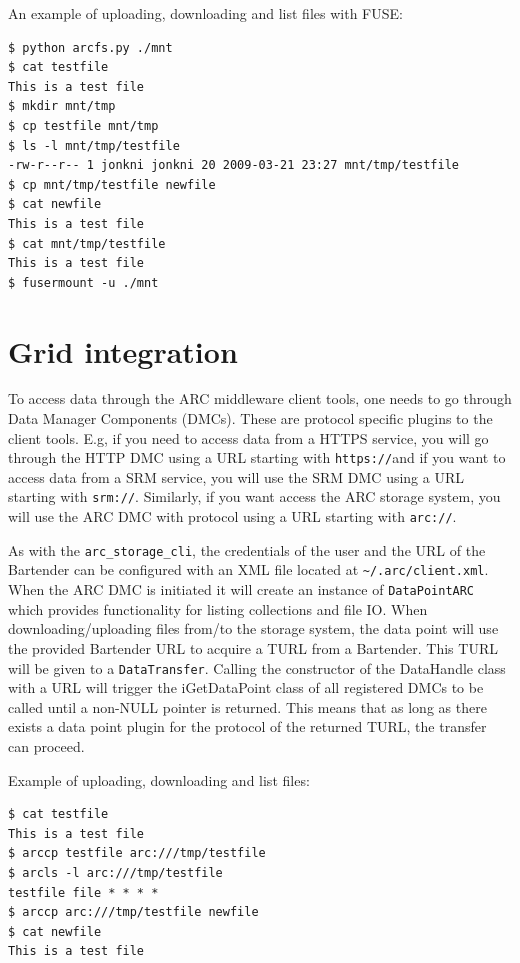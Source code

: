 \documentclass{book}
\begin{document}
An example of uploading, downloading and list files with FUSE:

\begin{verbatim}
$ python arcfs.py ./mnt
$ cat testfile
This is a test file
$ mkdir mnt/tmp
$ cp testfile mnt/tmp
$ ls -l mnt/tmp/testfile
-rw-r--r-- 1 jonkni jonkni 20 2009-03-21 23:27 mnt/tmp/testfile
$ cp mnt/tmp/testfile newfile
$ cat newfile
This is a test file
$ cat mnt/tmp/testfile
This is a test file
$ fusermount -u ./mnt
\end{verbatim}



\section{Grid integration} %
\label{sec:grid_integration}

To access data through the ARC middleware client tools, one needs to go through Data Manager Components (DMCs). These are protocol specific plugins to the client tools. E.g, if you need to access data from a HTTPS service, you will go through the HTTP DMC using a URL starting with \verb!https://!and if you want to access data from a SRM service, you will use the SRM DMC using a URL starting with \verb!srm://!. Similarly, if you want access the ARC storage system, you will use the ARC DMC with protocol using a URL starting with \verb!arc://!. 

As with the \verb!arc_storage_cli!, the credentials of the user and the URL of the Bartender can be configured with an XML file located at \verb!~/.arc/client.xml!. When the ARC DMC is initiated it will create an instance of \verb!DataPointARC! which provides functionality for listing collections and file IO. When downloading/uploading files from/to the storage system, the data point will use the provided Bartender URL to acquire a TURL from a Bartender. This TURL will be given to a \verb!DataTransfer!. Calling the constructor of the DataHandle class with a URL will trigger the iGetDataPoint class of all registered DMCs to be called until a non-NULL pointer is returned. This means that as long as there exists a data point plugin for the protocol of the returned TURL, the transfer can proceed.

Example of uploading, downloading and list files:

\begin{verbatim}
$ cat testfile
This is a test file
$ arccp testfile arc:///tmp/testfile
$ arcls -l arc:///tmp/testfile
testfile file * * * *
$ arccp arc:///tmp/testfile newfile
$ cat newfile
This is a test file
\end{verbatim}



% 
\end{document}

